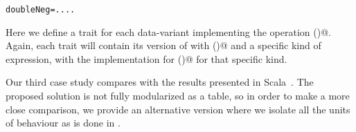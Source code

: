 \multiCode
\begin{lstlisting}
doubleNeg=....
\end{lstlisting}
Here we define a trait for each data-variant implementing the operation \Q@double()@.
Again, each trait will contain its version of \Q@Exp@ with \Q@double()@
and a specific kind of expression, with the implementation for \Q@double()@
for that specific kind.

Our third case study compares with the results presented
in Scala~\cite{Zenger-Odersky2005}.
The proposed solution is not fully modularized as a table,
so in order to make a more close comparison, we provide an alternative
version where we isolate all the units of behaviour as is done in \name.

